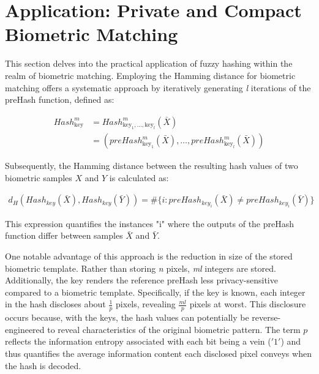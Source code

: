 \newpage
\section{Application: Private and Compact Biometric Matching}
\label{Application: Private and Compact Biometric Matching}

This section delves into the practical application of fuzzy hashing within the realm of biometric matching. Employing the Hamming distance for biometric matching offers a systematic approach by iteratively generating \textit{l} iterations of the preHash function, defined as:

\begin{equation}
    \begin{aligned}
        Hash_{\text{key}}^m &= Hash_{\text{key}_1, \ldots, \text{key}_l}^m(\bar{X})\\
        &= (preHash_{\text{key}_1}^m(\bar{X}), \ldots, preHash_{\text{key}_l}^m(\bar{X}))
    \end{aligned}
\end{equation}

Subsequently, the Hamming distance between the resulting hash values of two biometric samples \(X\) and \(Y\) is calculated as:

\begin{equation}
    \begin{aligned}
        \label{eq:HammingDist}
        d_H(Hash_{key}(\bar{X}), Hash_{key}(\bar{Y})) = \# \{i: preHash_{key_i}(\bar{X}) \neq preHash_{key_i}(\bar{Y})\}
    \end{aligned}
\end{equation}

This expression quantifies the instances "i" where the outputs of the preHash function differ between samples \(\bar{X}\) and \(\bar{Y}\).

One notable advantage of this approach is the reduction in size of the stored biometric template. Rather than storing \textit{n} pixels, \textit{ml} integers are stored. Additionally, the key renders the reference preHash less privacy-sensitive compared to a biometric template. Specifically, if the key is known, each integer in the hash discloses about \(\frac{1}{p}\) pixels, revealing \(\frac{ml}{p}\) pixels at worst. This disclosure occurs because, with the keys, the hash values can potentially be reverse-engineered to reveal characteristics of the original biometric pattern. The term \(p\)​ reflects the information entropy associated with each bit being a vein (\('1'\)) and thus quantifies the average information content each disclosed pixel conveys when the hash is decoded.

